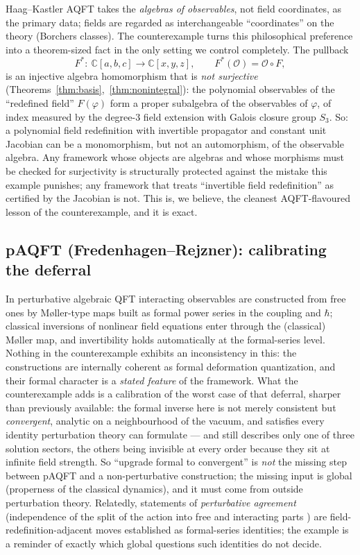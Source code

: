 \documentclass[11pt]{article}
\theoremstyle{definition}
\theoremstyle{remark}
\newcommand{\C}{\mathbb{C}}
\begin{document}
Haag--Kastler AQFT \cite{HK64} takes the \emph{algebras of observables},
not field coordinates, as the primary data; fields are regarded as
interchangeable ``coordinates'' on the theory (Borchers classes). The
counterexample turns this philosophical preference into a
theorem-sized fact in the only setting we control completely. The
pullback
\[
F^*:\ \C[a,b,c]\longrightarrow\C[x,y,z],\qquad
F^*(\mathcal{O})=\mathcal{O}\circ F,
\]
is an injective algebra homomorphism that is \emph{not surjective}
(Theorems~\ref{thm:basis},~\ref{thm:nonintegral}): the polynomial
observables of the ``redefined field'' $F(\varphi)$ form a proper
subalgebra of the observables of $\varphi$, of index measured by the
degree-3 field extension with Galois closure group $S_3$. So: a
polynomial field redefinition with invertible propagator and constant
unit Jacobian can be a monomorphism, but not an automorphism, of the
observable algebra. Any framework whose objects are algebras and whose
morphisms must be checked for surjectivity is structurally protected
against the mistake this example punishes; any framework that treats
``invertible field redefinition'' as certified by the Jacobian is not.
This is, we believe, the cleanest AQFT-flavoured lesson of the
counterexample, and it is exact.

\subsection{pAQFT (Fredenhagen--Rejzner): calibrating the deferral}
\label{sec:paqft}

In perturbative algebraic QFT \cite{FR12,FR16,Rej16} interacting
observables are constructed from free ones by M{\o}ller-type maps built
as formal power series in the coupling and $\hbar$; classical
inversions of nonlinear field equations enter through the (classical)
M{\o}ller map, and invertibility holds automatically at the
formal-series level. Nothing in the counterexample exhibits an
inconsistency in this: the constructions are internally coherent as
formal deformation quantization, and their formal character is a
\emph{stated feature} of the framework. What the counterexample adds
is a calibration of the worst case of that deferral, sharper than
previously available: the formal inverse here is not merely consistent
but \emph{convergent}, analytic on a neighbourhood of the vacuum, and
satisfies every identity perturbation theory can formulate --- and
still describes only one of three solution sectors, the others being
invisible at every order because they sit at infinite field strength.
So ``upgrade formal to convergent'' is \emph{not} the missing step
between pAQFT and a non-perturbative construction; the missing input
is global (properness of the classical dynamics), and it must come
from outside perturbation theory. Relatedly, statements of
\emph{perturbative agreement} (independence of the split of the action
into free and interacting parts \cite{HW05,DHP17}) are
field-redefinition-adjacent moves established as formal-series
identities; the example is a reminder of exactly which global questions
such identities do not decide.
\end{document}

